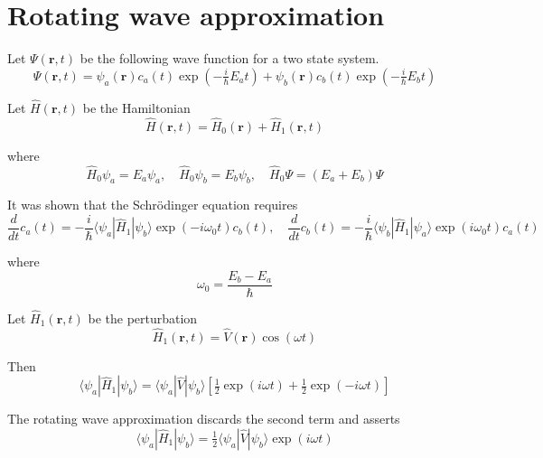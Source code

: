 

\section*{Rotating wave approximation}

Let $\Psi(\mathbf r,t)$ be the following wave function for a two state system.
\begin{equation*}
\Psi(\mathbf r,t)=\psi_a(\mathbf r)c_a(t)\exp(-\tfrac{i}{\hbar}E_at)+
\psi_b(\mathbf r)c_b(t)\exp(-\tfrac{i}{\hbar}E_bt)
\end{equation*}

Let $\hat H(\mathbf r,t)$ be the Hamiltonian
\begin{equation*}
\hat H(\mathbf r,t)=\hat H_0(\mathbf r)+\hat H_1(\mathbf r,t)
\end{equation*}

where
\begin{equation*}
\hat H_0\psi_a=E_a\psi_a,\quad\hat H_0\psi_b=E_b\psi_b,\quad
\hat H_0\Psi=(E_a+E_b)\Psi
\end{equation*}

It was shown that the Schr\"odinger equation requires
\begin{equation*}
\frac{d}{dt}c_a(t)=-\frac{i}{\hbar}\langle\psi_a|\hat H_1|\psi_b\rangle\exp(-i\omega_0t)c_b(t),\quad
\frac{d}{dt}c_b(t)=-\frac{i}{\hbar}\langle\psi_b|\hat H_1|\psi_a\rangle\exp(i\omega_0t)c_a(t)
\tag{1}
\end{equation*}

where
\begin{equation*}
\omega_0=\frac{E_b-E_a}{\hbar}
\end{equation*}

Let $\hat H_1(\mathbf r,t)$ be the perturbation
\begin{equation*}
\hat H_1(\mathbf r,t)=\hat V(\mathbf r)\cos(\omega t)
\end{equation*}

Then
\begin{equation*}
\langle\psi_a|\hat H_1|\psi_b\rangle
=\langle\psi_a|\hat V|\psi_b\rangle
\left[\tfrac{1}{2}\exp(i\omega t)+\tfrac{1}{2}\exp(-i\omega t)\right]
\end{equation*}

The rotating wave approximation discards the second term and asserts
\begin{equation*}
\langle\psi_a|\hat H_1|\psi_b\rangle=\tfrac{1}{2}\langle\psi_a|\hat V|\psi_b\rangle\exp(i\omega t)
\tag{2}
\end{equation*}

